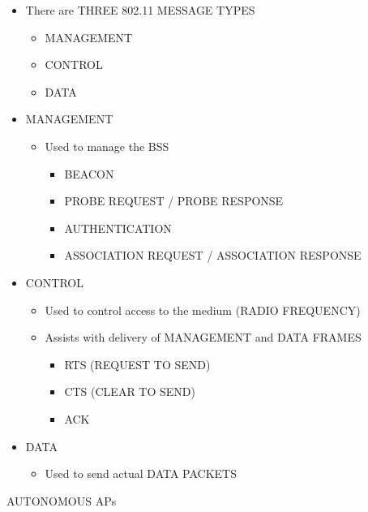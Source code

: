 \begin{itemize}
\tightlist
\item
  There are THREE 802.11 MESSAGE TYPES

  \begin{itemize}
  \tightlist
  \item
    MANAGEMENT
  \item
    CONTROL
  \item
    DATA
  \end{itemize}
\item
  MANAGEMENT

  \begin{itemize}
  \tightlist
  \item
    Used to manage the BSS

    \begin{itemize}
    \tightlist
    \item
      BEACON
    \item
      PROBE REQUEST / PROBE RESPONSE
    \item
      AUTHENTICATION
    \item
      ASSOCIATION REQUEST / ASSOCIATION RESPONSE
    \end{itemize}
  \end{itemize}
\item
  CONTROL

  \begin{itemize}
  \tightlist
  \item
    Used to control access to the medium (RADIO FREQUENCY)
  \item
    Assists with delivery of MANAGEMENT and DATA FRAMES

    \begin{itemize}
    \tightlist
    \item
      RTS (REQUEST TO SEND)
    \item
      CTS (CLEAR TO SEND)
    \item
      ACK
    \end{itemize}
  \end{itemize}
\item
  DATA

  \begin{itemize}
  \tightlist
  \item
    Used to send actual DATA PACKETS
  \end{itemize}
\end{itemize}

AUTONOMOUS APs


